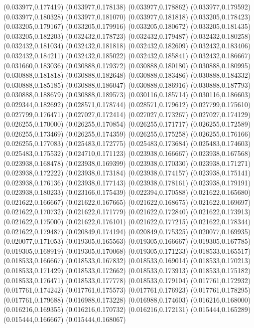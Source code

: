 (0.033977,0.177419)
(0.033977,0.178138)
(0.033977,0.178862)
(0.033977,0.179592)
(0.033977,0.180328)
(0.033977,0.181070)
(0.033977,0.181818)
(0.033205,0.178423)
(0.033205,0.179167)
(0.033205,0.179916)
(0.033205,0.180672)
(0.033205,0.181435)
(0.033205,0.182203)
(0.032432,0.178723)
(0.032432,0.179487)
(0.032432,0.180258)
(0.032432,0.181034)
(0.032432,0.181818)
(0.032432,0.182609)
(0.032432,0.183406)
(0.032432,0.184211)
(0.032432,0.185022)
(0.032432,0.185841)
(0.032432,0.186667)
(0.031660,0.183036)
(0.030888,0.179372)
(0.030888,0.180180)
(0.030888,0.180995)
(0.030888,0.181818)
(0.030888,0.182648)
(0.030888,0.183486)
(0.030888,0.184332)
(0.030888,0.185185)
(0.030888,0.186047)
(0.030888,0.186916)
(0.030888,0.187793)
(0.030888,0.188679)
(0.030888,0.189573)
(0.030116,0.185714)
(0.030116,0.186603)
(0.029344,0.182692)
(0.028571,0.178744)
(0.028571,0.179612)
(0.027799,0.175610)
(0.027799,0.176471)
(0.027027,0.172414)
(0.027027,0.173267)
(0.027027,0.174129)
(0.026255,0.170000)
(0.026255,0.170854)
(0.026255,0.171717)
(0.026255,0.172589)
(0.026255,0.173469)
(0.026255,0.174359)
(0.026255,0.175258)
(0.026255,0.176166)
(0.026255,0.177083)
(0.025483,0.172775)
(0.025483,0.173684)
(0.025483,0.174603)
(0.025483,0.175532)
(0.024710,0.171123)
(0.023938,0.166667)
(0.023938,0.167568)
(0.023938,0.168478)
(0.023938,0.169399)
(0.023938,0.170330)
(0.023938,0.171271)
(0.023938,0.172222)
(0.023938,0.173184)
(0.023938,0.174157)
(0.023938,0.175141)
(0.023938,0.176136)
(0.023938,0.177143)
(0.023938,0.178161)
(0.023938,0.179191)
(0.023938,0.180233)
(0.023166,0.175439)
(0.022394,0.170588)
(0.021622,0.165680)
(0.021622,0.166667)
(0.021622,0.167665)
(0.021622,0.168675)
(0.021622,0.169697)
(0.021622,0.170732)
(0.021622,0.171779)
(0.021622,0.172840)
(0.021622,0.173913)
(0.021622,0.175000)
(0.021622,0.176101)
(0.021622,0.177215)
(0.021622,0.178344)
(0.021622,0.179487)
(0.020849,0.174194)
(0.020849,0.175325)
(0.020077,0.169935)
(0.020077,0.171053)
(0.019305,0.165563)
(0.019305,0.166667)
(0.019305,0.167785)
(0.019305,0.168919)
(0.019305,0.170068)
(0.019305,0.171233)
(0.018533,0.165517)
(0.018533,0.166667)
(0.018533,0.167832)
(0.018533,0.169014)
(0.018533,0.170213)
(0.018533,0.171429)
(0.018533,0.172662)
(0.018533,0.173913)
(0.018533,0.175182)
(0.018533,0.176471)
(0.018533,0.177778)
(0.018533,0.179104)
(0.017761,0.172932)
(0.017761,0.174242)
(0.017761,0.175573)
(0.017761,0.176923)
(0.017761,0.178295)
(0.017761,0.179688)
(0.016988,0.173228)
(0.016988,0.174603)
(0.016216,0.168000)
(0.016216,0.169355)
(0.016216,0.170732)
(0.016216,0.172131)
(0.015444,0.165289)
(0.015444,0.166667)
(0.015444,0.168067)
